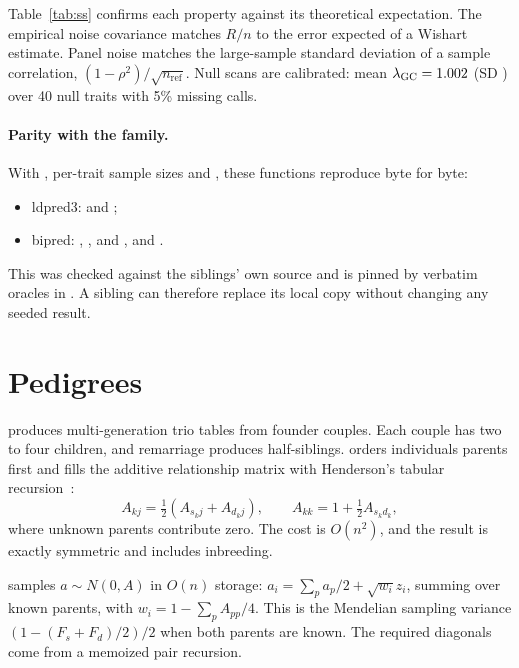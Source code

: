 \documentclass[11pt,a4paper]{article}
\begin{document}
Table~\ref{tab:ss} confirms each property against its theoretical
expectation. The empirical noise covariance matches $R/n$ to the error
expected of a Wishart estimate. Panel noise matches the large-sample
standard deviation of a sample correlation,
$(1-\rho^2)/\sqrt{n_{\mathrm{ref}}}$. Null scans are calibrated: mean
$\lambda_{\mathrm{GC}}=1.002$ (SD \PhLambdaSd{}) over 40 null
traits with 5\% missing calls.

\begin{table}[ht]\centering\small
\caption{Summary-statistic layer: properties versus expectation.}\label{tab:ss}
\resizebox{\textwidth}{!}{}
\end{table}

\paragraph{Parity with the family.}
With , per-trait sample sizes and , these
functions reproduce byte for byte:
\begin{itemize}
\item ldpred3:  and ;
\item bipred: , ,
   and , and
  .
\end{itemize}
This was checked against the siblings' own source and is pinned by
verbatim oracles in . A sibling can
therefore replace its local copy without changing any seeded result.

\section{Pedigrees}
 produces multi-generation trio tables from
founder couples. Each couple has two to four children, and remarriage
produces half-siblings.  orders individuals
parents first and fills the additive relationship matrix with Henderson's
tabular recursion~\cite{henderson1976}:
\[
A_{kj}=\tfrac12(A_{s_kj}+A_{d_kj}),\qquad A_{kk}=1+\tfrac12A_{s_kd_k},
\]
where unknown parents contribute zero. The cost is $O(n^2)$, and the result
is exactly symmetric and includes inbreeding.

 samples $a\sim N(0,A)$ in $O(n)$ storage:
$a_i=\sum_{p}a_p/2+\sqrt{w_i}z_i$, summing over known parents, with
$w_i=1-\sum_pA_{pp}/4$. This is the Mendelian sampling variance
$(1-(F_s+F_d)/2)/2$ when both parents are known. The required diagonals
come from a memoized pair recursion.
\end{document}
